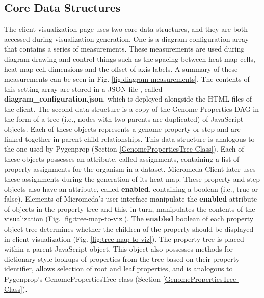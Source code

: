 \subsection{Core Data Structures} \label{visual-data-structures}

The client visualization page uses two core data structures, and they are both accessed during visualization generation. One is a diagram configuration array that contains a series of measurements. These measurements are used during diagram drawing and control things such as the spacing between heat map cells, heat map cell dimensions and the offset of axis labels. A summary of these measurements can be seen in Fig. \ref{fig:diagram-measurements}. The contents of this setting array are stored in a JSON file \cite{bray2014rfc}, called \textbf{diagram\_configuration.json}, which is deployed alongside the HTML files of the client. The second data structure is a copy of the Genome Properties DAG in the form of a tree (i.e., nodes with two parents are duplicated) of JavaScript objects. Each of these objects represents a genome property or step and are linked together in parent-child relationships. This data structure is analogous to the one used by Pygenprop (Section \ref{GenomePropertiesTree-Class}). Each of these objects possesses an attribute, called assignments, containing a list of property assignments for the organism in a dataset. Micromeda-Client later uses these assignments during the generation of its heat map. These property and step objects also have an attribute, called \textbf{enabled}, containing a boolean (i.e., true or false). Elements of Micromeda's user interface manipulate the \textbf{enabled} attribute of objects in the property tree and this, in turn, manipulates the contents of the visualization (Fig. \ref{fig:tree-map-to-viz}). The \textbf{enabled} boolean of each property object tree determines whether the children of the property should be displayed in client visualization (Fig. \ref{fig:tree-map-to-viz}). The property tree is placed within a parent JavaScript object. This object also possesses methods for dictionary-style lookups of properties from the tree based on their property identifier, allows selection of root and leaf properties, and is analogous to Pygenprop's GenomePropertiesTree class (Section \ref{GenomePropertiesTree-Class}).

